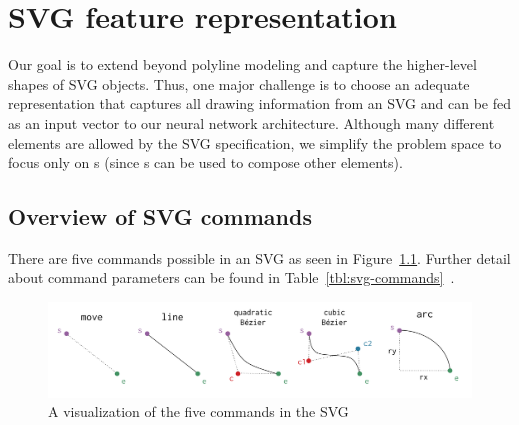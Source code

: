 \chapter{SVG feature representation}
Our goal is to extend beyond polyline modeling and capture the higher-level shapes of SVG objects.
Thus, one major challenge is to choose an adequate representation that captures all drawing information from an SVG and can be fed as an input vector to our neural network architecture.
Although many different elements are allowed by the SVG specification, we simplify the problem space to focus only on s (since s can be used to compose other elements). 

\section{Overview of SVG commands}
There are five commands possible in an SVG  as seen in Figure~\ref{fig:svg-commands}. Further detail about command parameters can be found in Table~\ref{tbl:svg-commands}~\cite{grasso2011svg}.

\begin{figure}[h]
    \centering
	\includegraphics[width=\textwidth]{figures/commands}
    \caption{A visualization of the five commands in the SVG \label{fig:svg-commands}}
\end{figure}


